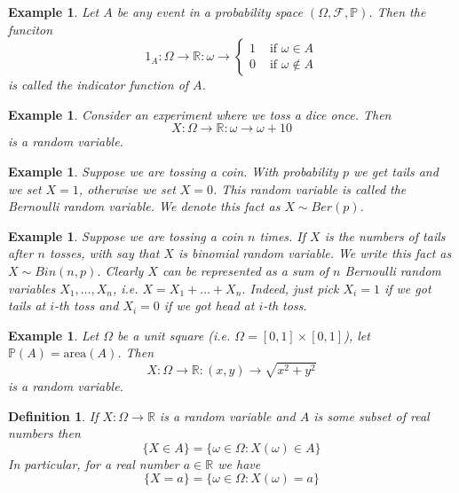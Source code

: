\documentclass[12pt]{article}
\newtheorem{definition}[theorem]{Definition}
\newtheorem{example}[theorem]{Example}
\begin{document}
\begin{example} Let $A$ be any event in a probability space 
    $(\Omega,\mathcal{F},\mathbb{P})$. Then the funciton
    $$
        1_A:\Omega\to\mathbb{R}:\omega\to
        \begin{cases}
            1 & \mbox{ if }\omega\in A    \\
            0 & \mbox{ if }\omega\notin A
        \end{cases}
    $$
    is called the indicator function of $A$.
\end{example}

\begin{example} Consider an experiment where we toss a dice once. Then
    $$
        X:\Omega\to\mathbb{R}:\omega\to \omega+10
    $$
    is a random variable.
\end{example}

\begin{example} Suppose we are tossing a coin. With probability $p$ we get tails
    and we set $X=1$, otherwise we set $X=0$. This random variable is called 
    the Bernoulli random variable. We denote this fact as $X\sim Ber(p)$.
\end{example}

\begin{example} Suppose we are tossing a coin $n$ times. If $X$ is the numbers
    of tails after $n$ tosses, with say that $X$ is binomial random variable. We
    write this fact as $X\sim Bin(n,p)$. Clearly $X$ can be represented as a sum
    of $n$ Bernoulli random variables $X_1,\ldots,X_n$, i.e.
    $X=X_1+\ldots+X_n$.    %
    Indeed, just pick $X_i=1$ if we got tails at $i$-th toss and $X_i=0$ if we
    got head at $i$-th toss.
\end{example}

\begin{example} Let $\Omega$ be a unit square (i.e. $\Omega=[0,1]\times[0,1]$),
    let $\mathbb{P}(A)=\mbox{area}(A)$. Then
    $$
        X:\Omega\to\mathbb{R}:(x,y)\to\sqrt{x^2+y^2}
    $$
    is a random variable.
\end{example}

\begin{definition} If $X:\Omega\to\mathbb{R}$ is a random variable and $A$ is
    some subset of real numbers then 
    $$
        \{X\in A\}=\{\omega\in\Omega:X(\omega)\in A\}
    $$
    In particular, for a real number $a\in\mathbb{R}$ we have
    $$
        \{X=a\}=\{\omega\in\Omega:X(\omega)=a\}
    $$
\end{definition}
\end{document}
